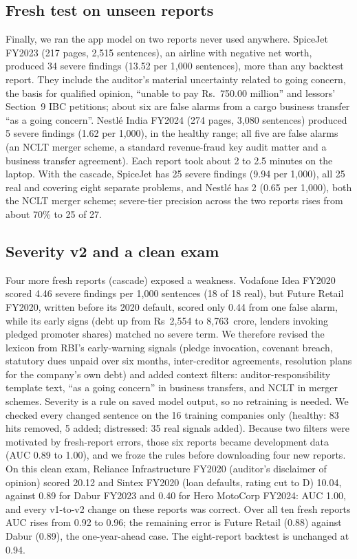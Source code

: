 \documentclass[conference]{IEEEtran}
\begin{document}
\subsection{Fresh test on unseen reports}
Finally, we ran the app model on two reports never used anywhere. SpiceJet FY2023 (217 pages, 2,515 sentences), an airline with negative net worth, produced 34 severe findings (13.52 per 1,000 sentences), more than any backtest report. They include the auditor's material uncertainty related to going concern, the basis for qualified opinion, ``unable to pay Rs.~750.00 million'' and lessors' Section~9 IBC petitions; about six are false alarms from a cargo business transfer ``as a going concern''. Nestl\'e India FY2024 (274 pages, 3,080 sentences) produced 5 severe findings (1.62 per 1,000), in the healthy range; all five are false alarms (an NCLT merger scheme, a standard revenue-fraud key audit matter and a business transfer agreement). Each report took about 2 to 2.5 minutes on the laptop. With the cascade, SpiceJet has 25 severe findings (9.94 per 1,000), all 25 real and covering eight separate problems, and Nestl\'e has 2 (0.65 per 1,000), both the NCLT merger scheme; severe-tier precision across the two reports rises from about 70\% to 25 of 27.

\subsection{Severity v2 and a clean exam}
Four more fresh reports (cascade) exposed a weakness. Vodafone Idea FY2020 scored 4.46 severe findings per 1,000 sentences (18 of 18 real), but Future Retail FY2020, written before its 2020 default, scored only 0.44 from one false alarm, while its early signs (debt up from Rs~2,554 to 8,763~crore, lenders invoking pledged promoter shares) matched no severe term. We therefore revised the lexicon from RBI's early-warning signals (pledge invocation, covenant breach, statutory dues unpaid over six months, inter-creditor agreements, resolution plans for the company's own debt) and added context filters: auditor-responsibility template text, ``as a going concern'' in business transfers, and NCLT in merger schemes. Severity is a rule on saved model output, so no retraining is needed. We checked every changed sentence on the 16 training companies only (healthy: 83 hits removed, 5 added; distressed: 35 real signals added). Because two filters were motivated by fresh-report errors, those six reports became development data (AUC 0.89 to 1.00), and we froze the rules before downloading four new reports. On this clean exam, Reliance Infrastructure FY2020 (auditor's disclaimer of opinion) scored 20.12 and Sintex FY2020 (loan defaults, rating cut to D) 10.04, against 0.89 for Dabur FY2023 and 0.40 for Hero MotoCorp FY2024: AUC 1.00, and every v1-to-v2 change on these reports was correct. Over all ten fresh reports AUC rises from 0.92 to 0.96; the remaining error is Future Retail (0.88) against Dabur (0.89), the one-year-ahead case. The eight-report backtest is unchanged at 0.94.
\end{document}
